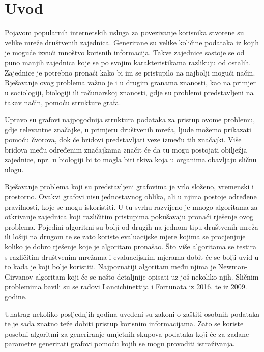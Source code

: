 \chapter{Uvod}

Pojavom popularnih internetskih usluga za povezivanje korisnika stvorene su velike mreže društvenih zajednica. Generirane su velike količine podataka iz kojih je moguće izvući mnoštvo korisnih informacija. Takve zajednice sastoje se od puno manjih zajednica koje se po svojim karakteristikama razlikuju od ostalih. Zajednice je potrebno pronaći kako bi im se pristupilo na najbolji mogući način. Rješavanje ovog problema važno je i u drugim granama znanosti, kao na primjer u sociologiji, biologiji ili računarskoj znanosti, gdje su problemi predstavljeni na takav način, pomoću strukture grafa. 

Upravo su grafovi najpogodnija struktura podataka za pristup ovome problemu, gdje relevantne značajke, u primjeru društvenih mreža, ljude možemo prikazati pomoću čvorova, dok će bridovi predstavljati veze između tih značajki. Više bridova među određenim značajkama značit će da tu mogu postojati obilježja zajednice, npr. u biologiji bi to mogla biti tkiva koja u organima obavljaju sličnu ulogu. 

Rješavanje problema koji su predstavljeni grafovima je vrlo složeno, vremenski i prostorno. Ovakvi grafovi nisu jednostavnog oblika, ali u njima postoje određene pravilnosti, koje se mogu iskoristiti. U tu svrhu razvijeno je mnogo algoritama za otkrivanje zajednica koji različitim pristupima pokušavaju pronaći rješenje ovog problema. Pojedini algoritmi su bolji od drugih na jednom tipu društvenih mreža ili lošiji na drugom te se zato koriste evaluacijske mjere kojima se procjenjuje koliko je dobro rješenje koje je algoritam pronašao. Što više algoritama se testira s različitim društvenim mrežama i evaluacijskim mjerama dobit će se bolji uvid u to kada je koji bolje koristiti. Najpoznatiji algoritam među njima je Newman-Girvanov algoritam koji će se nešto detaljnije opisati uz još nekoliko njih. Sličnim problemima bavili su se radovi Lancichinettija i Fortunata \cite{fortunato2016community} iz 2016. te \cite{lancichinetti2009community} iz 2009. godine.

Unatrag nekoliko posljednjih  godina uvedeni su zakoni o zaštiti osobnih podataka te je sada znatno teže dobiti pristup korisnim informacijama. Zato se koriste posebni algoritmi za generiranje umjetnih skupova podataka koji će za zadane parametre generirati grafovi pomoću kojih se mogu provoditi istraživanja. 

